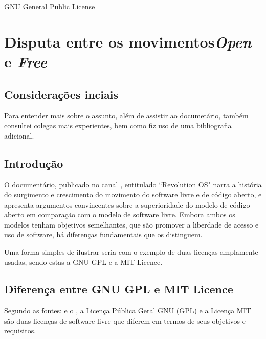 \documentclass[
	12pt,				%
	oneside,			%
	a4paper,			%
	english,			%
	brazil				%
	]{abntex2ppgsi}
\begin{document}
\frenchspacing 

\imprimircapa

\imprimirfolhaderosto*

\setlength{\absparsep}{18pt} 

\listoffigures*
\cleardoublepage

\begin{siglas}
  \item[GNU] General Public License
\end{siglas}

\tableofcontents*
\cleardoublepage



\textual

\chapter{Disputa entre os movimentos\emph{Open} e \emph{Free}}
\section{Considerações inciais}
Para entender mais sobre o assunto, além de assistir ao documetário, também consultei colegas mais experientes, bem como fiz uso de uma bibliografia adicional.

\section{Introdução}
O documentário, publicado no canal \emph{}, entitulado ``Revolution OS" narra a história do surgimento e crescimento do movimento do software livre e de código aberto, e apresenta argumentos convincentes sobre a superioridade do modelo de código aberto em comparação com o modelo de software livre. Embora ambos os modelos tenham objetivos semelhantes, que são promover a liberdade de acesso e uso de software, há diferenças fundamentais que os distinguem.



Uma forma simples de ilustrar seria com o exemplo de duas licenças amplamente usadas, sendo estas a GNU GPL e a MIT Licence.

\section{Diferença entre GNU GPL e MIT Licence}
Segundo as fontes:  e o , a Licença Pública Geral GNU (GPL) e a Licença MIT são duas licenças de software livre que diferem em termos de seus objetivos e requisitos.
\end{document}
